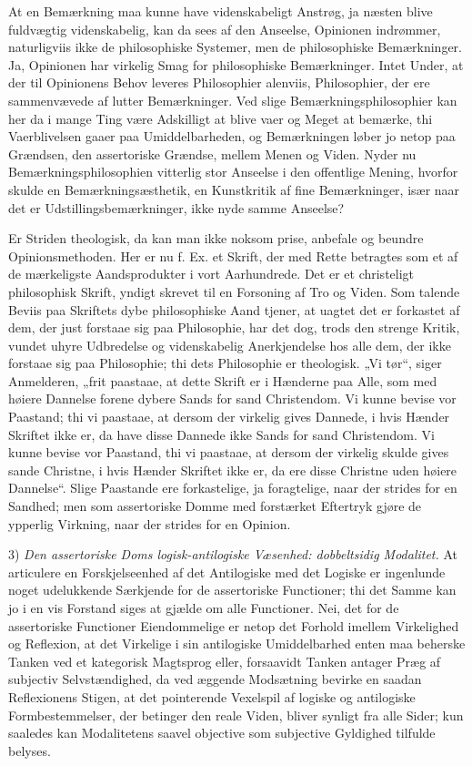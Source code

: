 \documentclass[12pt]{book}
\newcommand{\opage}[1]{\marginnote{\footnotesize\textit{[#1]}}}
\begin{document}
At en Bemærkning maa kunne have videnskabeligt Anstrøg,
ja næsten blive fuldvægtig videnskabelig, kan da sees af
den Anseelse, Opinionen indrømmer, naturligviis ikke de philosophiske
Systemer, men de philosophiske Bemærkninger. Ja,
Opinionen har virkelig Smag for philosophiske Bemærkninger.
Intet Under, at der til Opinionens Behov leveres Philosophier
alenviis, Philosophier, der ere sammenvævede af lutter
Bemærkninger. Ved slige Bemærkningsphilosophier kan her
da i mange Ting være Adskilligt at blive vaer og Meget at
bemærke, thi Vaerblivelsen gaaer paa Umiddelbarheden, og
Bemærkningen løber jo netop paa Grændsen, den assertoriske
Grændse, mellem Menen og Viden. Nyder nu Bemærkningsphilosophien
vitterlig stor Anseelse i den offentlige Mening, hvorfor
skulde en Bemærkningsæsthetik, en Kunstkritik af fine Bemærkninger,
især naar det er Udstillingsbemærkninger, ikke
nyde samme Anseelse?

Er Striden theologisk, da kan man ikke noksom prise,
\opage{201}anbefale og beundre Opinionsmethoden. Her er nu f. Ex.
et Skrift, der med Rette betragtes som et af de mærkeligste
Aandsprodukter i vort Aarhundrede. Det er et christeligt philosophisk
Skrift, yndigt skrevet til en Forsoning af Tro og Viden.
Som talende Beviis paa Skriftets dybe philosophiske Aand tjener,
at uagtet det er forkastet af dem, der just forstaae sig paa Philosophie,
har det dog, trods den strenge Kritik, vundet uhyre
Udbredelse og videnskabelig Anerkjendelse hos alle dem, der
ikke forstaae sig paa Philosophie; thi dets Philosophie er theologisk.
„Vi tør“, siger Anmelderen, „frit paastaae, at dette
Skrift er i Hænderne paa Alle, som med høiere Dannelse forene
dybere Sands for sand Christendom. Vi kunne bevise vor
Paastand; thi vi paastaae, at dersom der virkelig gives Dannede,
i hvis Hænder Skriftet ikke er, da have disse Dannede
ikke Sands for sand Christendom. Vi kunne bevise vor Paastand,
thi vi paastaae, at dersom der virkelig skulde gives
sande Christne, i hvis Hænder Skriftet ikke er, da ere disse
Christne uden høiere Dannelse“. Slige Paastande ere forkastelige,
ja foragtelige, naar der strides for en Sandhed;
men som assertoriske Domme med forstærket Eftertryk gjøre
de ypperlig Virkning, naar der strides for en Opinion.

3) \emph{Den assertoriske Doms logisk-antilogiske
Væsenhed: dobbeltsidig Modalitet.} At articulere en
Forskjelseenhed af det Antilogiske med det Logiske er ingenlunde
noget udelukkende Særkjende for de assertoriske Functioner;
thi det Samme kan jo i en vis Forstand siges at
gjælde om alle Functioner. Nei, det for de assertoriske Functioner
Eiendommelige er netop det Forhold imellem Virkelighed
og Reflexion, at det Virkelige i sin antilogiske Umiddelbarhed
enten maa beherske Tanken ved et kategorisk Magtsprog
eller, forsaavidt Tanken antager Præg af subjectiv Selvstændighed,
da ved æggende Modsætning bevirke en saadan
Reflexionens Stigen, at det pointerende Vexelspil af logiske og
antilogiske Formbestemmelser, der betinger den reale Viden,
\opage{202}bliver synligt fra alle Sider; kun saaledes kan Modalitetens
saavel objective som subjective Gyldighed tilfulde belyses.
\end{document}
